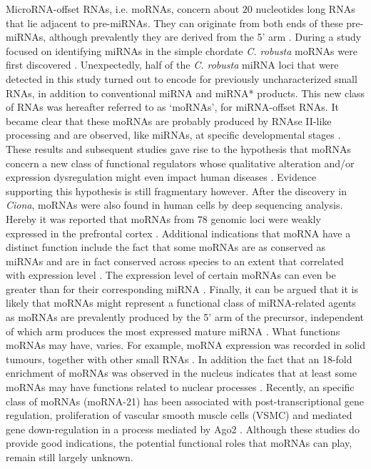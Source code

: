 \documentclass[graybox]{svmult}
\begin{document}
MicroRNA-offset RNAs, i.e. moRNAs, concern about $20$ nucleotides long RNAs 
that lie adjacent to pre-miRNAs. They can originate from both ends of these 
pre-miRNAs, although prevalently they are derived from the 5' arm 
\cite{bortoluzzi2011}. During a study focused on identifying miRNAs in the 
simple chordate \textit{C. robusta} moRNAs were first discovered 
\cite{Shi2009}. Unexpectedly, half of the \textit{C. robusta} miRNA loci 
that were detected in this study turned out to encode for 
previously uncharacterized small RNAs, in addition to conventional miRNA and 
miRNA* products. This new class of RNAs was hereafter referred to as `moRNAs', 
for miRNA-offset RNAs. It became clear that these moRNAs are probably produced 
by RNAse II-like processing and are observed, like miRNAs, at specific 
developmental stages \cite{Shi2009}.
These results and subsequent studies gave rise to the hypothesis that moRNAs 
concern  a new class of functional regulators whose qualitative alteration 
and/or expression dysregulation might even impact human diseases 
\cite{bortoluzzi2011}. Evidence supporting this hypothesis is still fragmentary 
however. After the discovery in \textit{Ciona}, moRNAs were 
also found in human cells by deep sequencing analysis. Hereby it was reported 
that moRNAs from $78$ genomic loci were weakly expressed in the prefrontal 
cortex \cite{Langenberger2009}. Additional indications that moRNA have a 
distinct function include the fact that some moRNAs are as conserved as miRNAs 
and are in fact conserved across species to an extent that correlated with 
expression level \cite{Shi2009}. The expression level of certain moRNAs can 
even be greater than for their corresponding miRNA \cite{Umbach2010}. Finally, 
it can be argued \cite{bortoluzzi2011} that it is likely that moRNAs might 
represent a functional class of miRNA-related agents as moRNAs are prevalently 
produced by the 5' arm of the precursor, independent of which arm produces the 
most expressed mature miRNA \cite{Langenberger2009, Umbach2010}. 
What functions moRNAs may have, varies. For example, moRNA expression was 
recorded in solid tumours, together with other small RNAs \cite{Meiri2010}. 
In addition the fact that an 18-fold enrichment of moRNAs was observed in the 
nucleus \cite{Taft2010} indicates that at least some moRNAs may have functions related to nuclear processes \cite{bortoluzzi2011}. Recently, an specific class of moRNAs (moRNA-21) has been associated with post-transcriptional gene regulation, proliferation of vascular smooth muscle cells (VSMC) and mediated gene down-regulation in a process mediated by Ago2 \cite{Zhao2016}. Although these studies do provide good indications, the potential functional roles that moRNAs can play, remain still largely unknown. 
\end{document}
